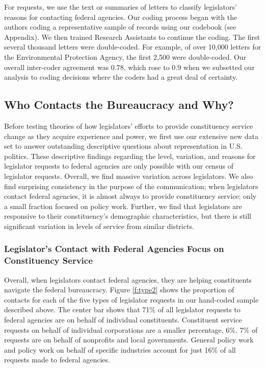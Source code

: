 \documentclass[12pt]{article}
\begin{document}
For  requests, we use the text or summaries of letters to classify legislators' reasons for contacting federal agencies. Our coding process began with the authors coding a representative sample of records using our codebook (see Appendix). We then trained Research Assistants to continue the coding. The first several thousand letters were double-coded. For example, of over 10,000 letters for the Environmental Protection Agency, the first 2,500 were double-coded. Our overall inter-coder agreement was 0.78, which rose to 0.9 when we subsetted our analysis to coding decisions where the coders had a great deal of certainty. 


\subsection{Who Contacts the Bureaucracy and Why?} \label{s:descriptive} 
Before testing theories of how legislators' efforts to provide constituency service change as they acquire experience and power, we first use our extensive new data set to answer outstanding descriptive questions about representation in U.S. politics. These descriptive findings regarding the level, variation, and reasons for legislator requests to federal agencies are only possible with our census of legislator requests. Overall, we find massive variation across legislators. We also find surprising consistency in the purpose of the communication; when legislators contact federal agencies, it is almost always to provide constituency service; only a small fraction focused on policy work. Further, we find that legislators are responsive to their constituency's demographic characteristics, but there is still significant variation in levels of service from similar districts.  

\subsubsection{Legislator's Contact with Federal Agencies Focus on Constituency Service}
Overall, when legislators contact federal agencies, they are helping constituents navigate the federal bureaucracy. Figure \ref{f:type2} shows the proportion of contacts for each of the five types of legislator requests in our hand-coded sample described above. The center bar shows that 71\% of all legislator requests to federal agencies are on behalf of individual constituents. Constituent service requests on behalf of individual corporations are a smaller percentage, 6\%. 7\% of requests are on behalf of nonprofits and local governments. General policy work and policy work on behalf of specific industries account for just 16\% of all requests made to federal agencies.  
\end{document}
